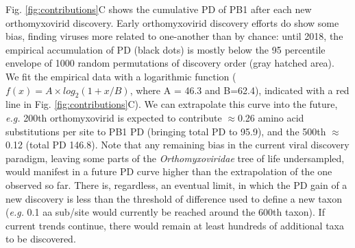 \documentclass[11pt,twocolumn]{article}
\begin{document}
Fig. \ref{fig:contributions}C shows the cumulative PD of PB1 after each new orthomyxovirid discovery. Early orthomyxovirid discovery efforts do show some bias, finding viruses more related to one-another than by chance: until 2018, the empirical accumulation of PD (black dots) is mostly below the 95 percentile envelope of 1000 random permutations of discovery order (gray hatched area). We fit the empirical data with a logarithmic function ($f(x) = A \times log_{2} (1 + x/B)$, where A = 46.3 and B=62.4), indicated with a red line in Fig. \ref{fig:contributions}C). We can extrapolate this curve into the future, \textit{e.g.} 200th orthomyxovirid is expected to contribute $\approx$0.26 amino acid substitutions per site to PB1 PD (bringing total PD to 95.9), and the 500th $\approx$0.12 (total PD 146.8). Note that any remaining bias in the current viral discovery paradigm, leaving some parts of the \textit{Orthomyxoviridae} tree of life undersampled, would manifest in a future PD curve higher than the extrapolation of the one observed so far. There is, regardless, an eventual limit, in which the PD gain of a new discovery is less than the threshold of difference used to define a new taxon (\textit{e.g.} 0.1 aa sub/site would currently be reached around the 600th taxon). If current trends continue, there would remain at least hundreds of additional taxa to be discovered.
\end{document}
